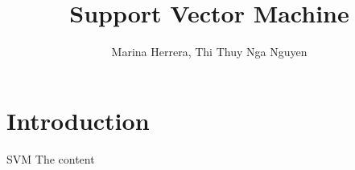 \documentclass[unknownkeysallowed,10pt]{beamer}
\title[SVM] %
{Support Vector Machine}
\author[Marina Herrera, Nga Nguyen]
{
{\large Marina Herrera, Thi Thuy Nga Nguyen}
}
\institute[] %
{
DD2421 - Machine Learning\\
KTH Royal Institute of Technology, Sweden
}
\date[February 2019] %
\theoremstyle{definition} \newtheorem{rem}[thm]{Remark} \newtheorem*{rem*}{Remark}
\begin{document}
\begin{frame}
  \titlepage
\end{frame}





\section{Introduction}

\begin{frame}{SVM}
The content
\end{frame}
\end{document}
